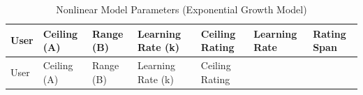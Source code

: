 \documentclass[
]{article}
\begin{document}
\begin{longtable}[]{@{}
  >{\raggedright\arraybackslash}p{}
  >{\raggedleft\arraybackslash}p{}
  >{\raggedleft\arraybackslash}p{}
  >{\raggedleft\arraybackslash}p{}
  >{\raggedleft\arraybackslash}p{}
  >{\raggedleft\arraybackslash}p{}
  >{\raggedleft\arraybackslash}p{}@{}}
\caption{Nonlinear Model Parameters (Exponential Growth
Model)}\tabularnewline
\toprule\noalign{}
\begin{minipage}[b]{\linewidth}\raggedright
User
\end{minipage} & \begin{minipage}[b]{\linewidth}\raggedleft
Ceiling (A)
\end{minipage} & \begin{minipage}[b]{\linewidth}\raggedleft
Range (B)
\end{minipage} & \begin{minipage}[b]{\linewidth}\raggedleft
Learning Rate (k)
\end{minipage} & \begin{minipage}[b]{\linewidth}\raggedleft
Ceiling Rating
\end{minipage} & \begin{minipage}[b]{\linewidth}\raggedleft
Learning Rate
\end{minipage} & \begin{minipage}[b]{\linewidth}\raggedleft
Rating Span
\end{minipage} \\
\midrule\noalign{}
\endfirsthead
\toprule\noalign{}
\begin{minipage}[b]{\linewidth}\raggedright
User
\end{minipage} & \begin{minipage}[b]{\linewidth}\raggedleft
Ceiling (A)
\end{minipage} & \begin{minipage}[b]{\linewidth}\raggedleft
Range (B)
\end{minipage} & \begin{minipage}[b]{\linewidth}\raggedleft
Learning Rate (k)
\end{minipage} & \begin{minipage}[b]{\linewidth}\raggedleft
Ceiling Rating
\end{minipage} & \begin{minipage}[b]{\linewidth}\raggedleft

\end{minipage}
\end{longtable}
\end{document}
